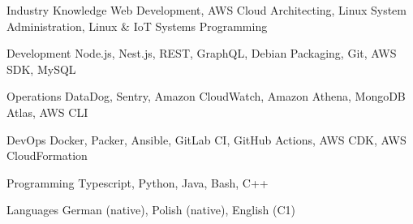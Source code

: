 

\begin{cvskills}

  \cvskill
  {Industry Knowledge}
  {Web Development, AWS Cloud Architecting, Linux System Administration, Linux \& IoT Systems Programming}  

  \cvskill
    {Development} %
    {Node.js, Nest.js, REST, GraphQL, Debian Packaging, Git, AWS SDK, MySQL} %

  \cvskill
    {Operations} %
    {DataDog, Sentry, Amazon CloudWatch, Amazon Athena, MongoDB Atlas, AWS CLI} %

  \cvskill
    {DevOps} %
    {Docker, Packer, Ansible, GitLab CI, GitHub Actions, AWS CDK, AWS CloudFormation} %

  \cvskill
    {Programming} %
    {Typescript, Python, Java, Bash, C++} %

  \cvskill
    {Languages} %
    {German (native), Polish (native), English (C1)} %

\end{cvskills}
